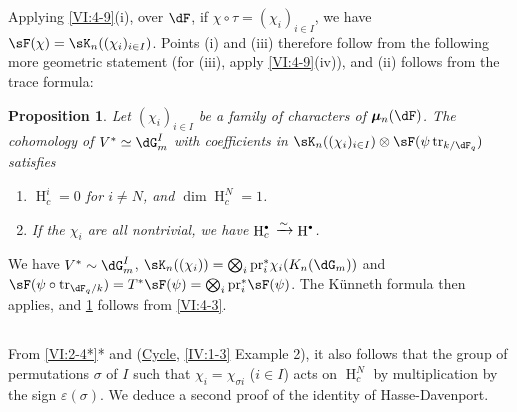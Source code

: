 \documentclass[oneside]{book}
\DeclareMathOperator{\h}{H}
\DeclareMathOperator{\tr}{tr}
\newcommand{\dmu}{{\bm\mu}}
\newcounter{char}
\newcommand{\iso}{\xrightarrow\sim}
\newcommand{\pr}{\mathrm{pr}} %
\theoremstyle{sga-source}
\theoremstyle{sga-source-dash}
\theoremstyle{sga-source-dotdash}
\theoremstyle{sga-source-number-note-dash}
\theoremstyle{sga-source-note-number-dotdash}
\theoremstyle{sga-source-example-dotdash}
\theoremstyle{sga-source-inline-number}
\theoremstyle{sga-source-bare-number}
\theoremstyle{sga-source}
\newtheorem{proposition_}[subsection]{Proposition}
\let\oldbullet\bullet
\renewcommand{\bullet}{\textnormal{\tiny$\oldbullet$}}
\newcommand{\PrintPage}[1]{}\newcommand{\MathPage}[1]{}\newcommand{\PrintCite}[2]{#1}\newcommand{\var}[3]{#1}
\begin{document}
Applying \ref{VI:4-9}(i), over $\dF$, if $\chi\circ \tau=(\chi_i)_{i\in I}$, 
we have $\sF(\chi) = \sK_n((\chi_i)_{i\in I})$. Points (i) and (iii) 
therefore follow from the following more geometric statement (for (iii), 
apply \ref{VI:4-9}(iv)), and (ii) follows from the trace formula: 





\begin{proposition_}\label{VI:4-11}
Let $(\chi_i)_{i\in I}$ be a family of characters of $\dmu_n(\dF)$. The 
cohomology of $V^\ast\simeq \dG_m^I$ with coefficients in 
$\sK_n((\chi_i)_{i\in I})\otimes \sF(\psi\tr_{k/\dF_q})$ satisfies 
\begin{enumerate}[\indent (i)]
  \item $\h_c^i{}=0$ for $i\ne N$, and $\dim \h_c^N{} = 1$. 
  \item If the $\chi_i$ are all nontrivial, we have 
    $\h_c^\bullet{}\iso \h^\bullet$. 
\end{enumerate}
\end{proposition_}

\PrintPage{202}
We have $V^\ast\sim \dG_m^I$, 
$\sK_n((\chi_i)) = \bigotimes_i \pr_i^\ast \chi_i(K_n(\dG_m))$ and 
$\sF(\psi\circ \var{\tr_{\dF_q/k}}{\tr_{k/\dF_q}}{S45-SOL-0828})=T^\ast \sF(\psi) = \bigotimes_i \pr_i^\ast \sF(\psi)$. 
The K\"unneth formula then applies, and \ref{VI:4-11} follows from 
\ref{VI:4-3}. 





\subsection{}\label{VI:4-12}

From \ref{VI:2-4*}* and (\hyperref[IV]{Cycle}, \ref{IV:1-3} Example 2), it also follows 
that the group of permutations $\sigma$ of $I$ such that 
$\chi_i = \chi_{\sigma i}$ ($i\in I$) acts on $\h_c^N$ by multiplication by 
the sign $\varepsilon(\sigma)$. We deduce a second proof 
of the identity of Hasse-Davenport. 
\end{document}
